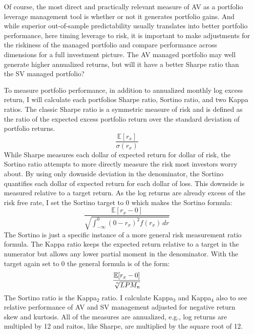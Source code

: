 Of course, the most direct and practically relevant measure of AV as a portfolio leverage management tool is whether or not it generates portfolio gains. And while superior out-of-sample predictability usually translates into better portfolio performance, here timing leverage to risk, it is important to make adjustments for the riskiness of the managed portfolio and compare performance across dimensions for a full investment picture. The AV managed portfolio may well generate higher annualized returns, but will it have a better Sharpe ratio than the SV managed portfolio?

To measure portfolio performance, in addition to annualized monthly log excess return, I will calculate each portfolios Sharpe ratio, Sortino ratio, and two Kappa ratios. The classic Sharpe ratio is a symmetric measure of risk and is defined as the ratio of the expected excess portfolio return over the standard deviation of portfolio returns.
\begin{equation}
	\frac{\mathbb{E}[r_{x}]}{\sigma(r_{x})}
\end{equation}
While Sharpe measures each dollar of expected return for dollar of risk, the Sortino ratio attempts to more directly measure the risk most investors worry about. By using only downside deviation in the denominator, the Sortino quantifies each dollar of expected return for each dollar of loss. This downside is measured relative to a target return. \citep{sortino_performance_1994} As the log returns are already excess of the risk free rate, I set the Sortino target to 0 which makes the Sortino formula:
\begin{equation}
	\frac{\mathbb{E}[r_{x} - 0]}{\sqrt  {\int _{{-\infty }}^{0}(0-r_{x})^{2}f(r_{x})\,dr}}
\end{equation}
The Sortino is just a specific instance of a more general risk measurement ratio formula. The Kappa ratio keeps the expected return relative to a target in the numerator but allows any lower partial moment in the denominator. \citep{kaplan_kappa:_2004} With the target again set to 0 the general formula is of the form:
\begin{equation}
\frac{\mathbb{E}[r_{x} - 0]}{\sqrt[\leftroot{-2}\uproot{2}n]{LPM_{n}}} 
\end{equation}
The Sortino ratio is the Kappa$_{2}$ ratio. I calculate Kappa$_{3}$ and Kappa$_{4}$ also to see relative performance of AV and SV management adjusted for negative return skew and kurtosis. All of the measures are annualized, e.g., log returns are multipled by 12 and raitos, like Sharpe, are multiplied by the square root of 12. 

